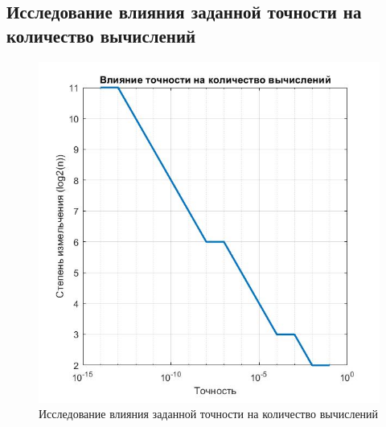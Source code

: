 \documentclass[a4paper]{article}
\begin{document}
\subsection{Исследование влияния заданной точности на количество вычислений}
\begin{figure}[h!]
\begin{center}
\includegraphics[scale=0.7]{влияние точности на кол-во вычислений.jpg} 
\end{center}
\caption{Исследование влияния заданной точности на количество вычислений} \label{Рис4}
\end{figure}
\end{document}
